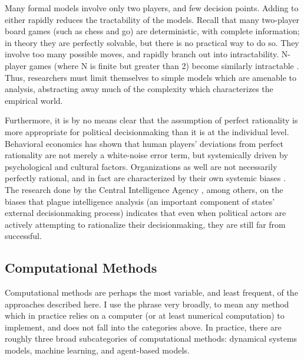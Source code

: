 Many formal models involve only two players, and few decision points. Adding to either rapidly reduces the tractability of the models. Recall that many two-player board games (such as chess and go) are deterministic, with complete information; in theory they are perfectly solvable, but there is no practical way to do so. They involve too many possible moves, and rapidly branch out into intractability. N-player games (where N is finite but greater than 2) become similarly intractable \citep{papadimitriou_2005}. Thus, researchers must limit themselves to simple models which are amenable to analysis, abstracting away much of the complexity which characterizes the empirical world.

Furthermore, it is by no means clear that the assumption of perfect rationality is more appropriate for political decisionmaking than it is at the individual level. Behavioral economics has shown that human players' deviations from perfect rationality are not merely a white-noise error term, but systemically driven by psychological \citep{tversky_1981} and cultural \citep{henrich_2005} factors. Organizations as well are not necessarily perfectly rational, and in fact are characterized by their own systemic biases \citep{shapira_2002}. The research done by the Central Intelligence Agency \citep{heuer_2001}, among others, on the biases that plague intelligence analysis (an important component of states' external decisionmaking process) indicates that even when political actors are actively attempting to rationalize their decisionmaking, they are still far from successful.

\subsection{Computational Methods}\label{computational-methods}

Computational methods are perhaps the most variable, and least frequent, of the approaches described here. I use the phrase very broadly, to mean any method which in practice relies on a computer (or at least numerical computation) to implement, and does not fall into the categories above. In practice, there are roughly three broad subcategories of computational methods: dynamical systems models, machine learning, and agent-based models.

